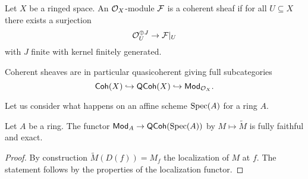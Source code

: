 \begin{definition}\label{def: coherent sheaf}
    Let $X$ be a ringed space. An $\mathcal{O}_{X}$-module $\mathcal{F}$ is a coherent sheaf if for all $U\subseteq X$ there exists a surjection 
    $$\mathcal{O}_{U}^{\oplus J}\to\mathcal{F}|_{U}$$
    with $J$ finite with kernel finitely generated. 
\end{definition}
\begin{remark}
    Coherent sheaves are in particular quasicoherent giving full subcategories 
    $$\mathsf{Coh}(X)\hookrightarrow\mathsf{QCoh}(X)\hookrightarrow\mathsf{Mod}_{\mathcal{O}_{X}}.$$
\end{remark}
Let us consider what happens on an affine scheme $\operatorname{Spec}(A)$ for a ring $A$. 
\begin{proposition}
    Let $A$ be a ring. The functor $\mathsf{Mod}_{A}\to\mathsf{QCoh}(\operatorname{Spec}(A))$ by $M\mapsto\widetilde{M}$ is fully faithful and exact. 
\end{proposition}
\begin{proof}
    By construction $\widetilde{M}(D(f))=M_{f}$ the localization of $M$ at $f$. The statement follows by the properties of the localization functor. 
\end{proof}